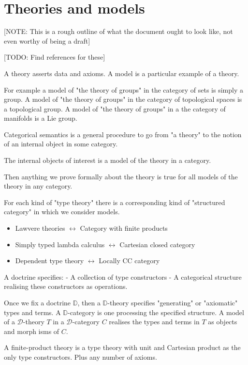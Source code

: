 \section{Theories and models}

[NOTE: This is a rough outline of what the document ought to look like, not even worthy of being a draft]

[TODO: Find references for these]
\begin{defin}
    A theory asserts data and axioms.
    A model is a particular example of a theory.
\end{defin}

For example a model of "the theory of groups" in the category of sets is simply a group. A model of "the theory of groups" in the category of topological spaces is a topological group. A model of "the theory of groups" in a the category of manifolds is a Lie group.

Categorical semantics is a general procedure to go from "a theory" to the notion of an internal object in some category.

The internal objects of interest is a model of the theory in a category.

Then anything we prove formally about the theory is true for all models of the theory in any category.

For each kind of "type theory" there is a corresponding kind of "structured category" in which we consider models.

\begin{itemize}
\item Lawvere theories $\leftrightarrow$ Category with finite products
\item Simply typed lambda calculus $\leftrightarrow$ Cartesian closed category
\item Dependent type theory $\leftrightarrow$ Locally CC category
\end{itemize}

A doctrine specifies:
 - A collection of type constructors
 - A categorical structure realising these constructors as operations.

Once we fix a doctrine $\mathbb{D}$, then a $\mathbb{D}$-theory specifies "generating" or "axiomatic" types and terms.
A $\mathbb{D}$-category is one processing the specified structure.
A model of a $\mathcal{D}$-theory $T$ in a $\mathcal{D}$-category $C$ realises the types and terms in $T$ as objects and morph isms of $C$.

A finite-product theory is a type theory with unit and Cartesian product as the only type constructors. Plus any number of axioms.


